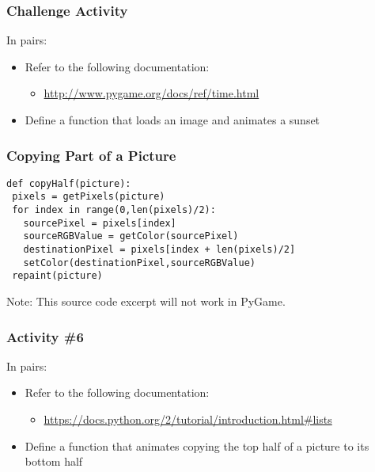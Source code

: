 \begin{frame}
	\frametitle{Challenge Activity}
	
	In pairs:
	
	\vspace{2em}
	
	\begin{itemize}
		\item Refer to the following documentation:
		\begin{itemize}
			\item \url{http://www.pygame.org/docs/ref/time.html}
		\end{itemize}
		\item Define a function that loads an image and animates a sunset
	\end{itemize}
\end{frame}

\begin{frame}[fragile]
	\frametitle{Copying Part of a Picture}

\begin{lstlisting}
def copyHalf(picture):
 pixels = getPixels(picture)
 for index in range(0,len(pixels)/2):
   sourcePixel = pixels[index]
   sourceRGBValue = getColor(sourcePixel)
   destinationPixel = pixels[index + len(pixels)/2]
   setColor(destinationPixel,sourceRGBValue)
 repaint(picture)
\end{lstlisting}

Note: This source code excerpt will not work in PyGame.

\end{frame}

\begin{frame}
	\frametitle{Activity \#6}
	
	In pairs:
	
	\vspace{2em}
	
	\begin{itemize}
		\item Refer to the following documentation:
		\begin{itemize}
			\item \url{https://docs.python.org/2/tutorial/introduction.html\#lists}
		\end{itemize}
		\item Define a function that animates copying the top half of a picture to its bottom half
	\end{itemize}
\end{frame}


